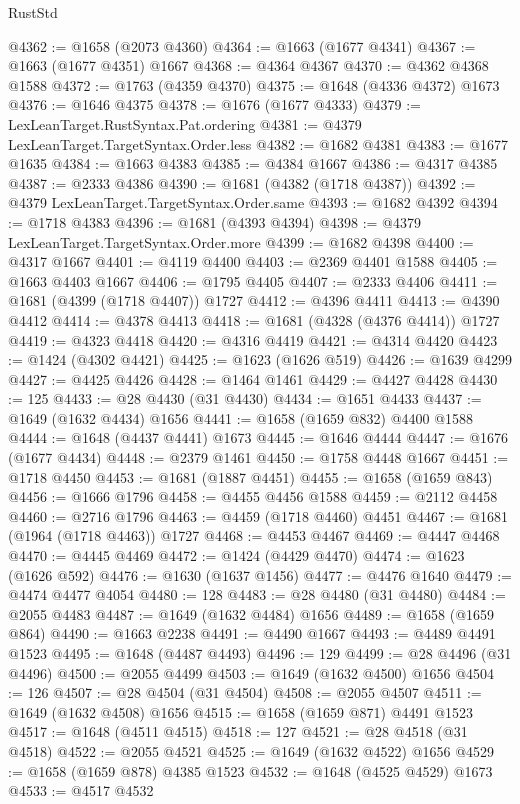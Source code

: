 \begin{lexlean}{RustStd}
\begin{coremodule}
{\begin{coremodule}
{{{{{{{{{{{{{{{{{{{{{{{{{{{{{{{{{{{{{{{{{{{{@4362 := @1658 (@2073 @4360)
@4364 := @1663 (@1677 @4341)
@4367 := @1663 (@1677 @4351) @1667
@4368 := @4364 @4367
@4370 := @4362 @4368 @1588
@4372 := @1763 (@4359 @4370)
@4375 := @1648 (@4336 @4372) @1673
@4376 := @1646 @4375
@4378 := @1676 (@1677 @4333)
@4379 := LexLeanTarget.RustSyntax.Pat.ordering
@4381 := @4379 LexLeanTarget.TargetSyntax.Order.less
@4382 := @1682 @4381
@4383 := @1677 @1635
@4384 := @1663 @4383
@4385 := @4384 @1667
@4386 := @4317 @4385
@4387 := @2333 @4386
@4390 := @1681 (@4382 (@1718 @4387))
@4392 := @4379 LexLeanTarget.TargetSyntax.Order.same
@4393 := @1682 @4392
@4394 := @1718 @4383
@4396 := @1681 (@4393 @4394)
@4398 := @4379 LexLeanTarget.TargetSyntax.Order.more
@4399 := @1682 @4398
@4400 := @4317 @1667
@4401 := @4119 @4400
@4403 := @2369 @4401 @1588
@4405 := @1663 @4403 @1667
@4406 := @1795 @4405
@4407 := @2333 @4406
@4411 := @1681 (@4399 (@1718 @4407)) @1727
@4412 := @4396 @4411
@4413 := @4390 @4412
@4414 := @4378 @4413
@4418 := @1681 (@4328 (@4376 @4414)) @1727
@4419 := @4323 @4418
@4420 := @4316 @4419
@4421 := @4314 @4420
@4423 := @1424 (@4302 @4421)
@4425 := @1623 (@1626 @519)
@4426 := @1639 @4299
@4427 := @4425 @4426
@4428 := @1464 @1461
@4429 := @4427 @4428
@4430 := 125
@4433 := @28 @4430 (@31 @4430)
@4434 := @1651 @4433
@4437 := @1649 (@1632 @4434) @1656
@4441 := @1658 (@1659 @832) @4400 @1588
@4444 := @1648 (@4437 @4441) @1673
@4445 := @1646 @4444
@4447 := @1676 (@1677 @4434)
@4448 := @2379 @1461
@4450 := @1758 @4448 @1667
@4451 := @1718 @4450
@4453 := @1681 (@1887 @4451)
@4455 := @1658 (@1659 @843)
@4456 := @1666 @1796
@4458 := @4455 @4456 @1588
@4459 := @2112 @4458
@4460 := @2716 @1796
@4463 := @4459 (@1718 @4460) @4451
@4467 := @1681 (@1964 (@1718 @4463)) @1727
@4468 := @4453 @4467
@4469 := @4447 @4468
@4470 := @4445 @4469
@4472 := @1424 (@4429 @4470)
@4474 := @1623 (@1626 @592)
@4476 := @1630 (@1637 @1456)
@4477 := @4476 @1640
@4479 := @4474 @4477 @4054
@4480 := 128
@4483 := @28 @4480 (@31 @4480)
@4484 := @2055 @4483
@4487 := @1649 (@1632 @4484) @1656
@4489 := @1658 (@1659 @864)
@4490 := @1663 @2238
@4491 := @4490 @1667
@4493 := @4489 @4491 @1523
@4495 := @1648 (@4487 @4493)
@4496 := 129
@4499 := @28 @4496 (@31 @4496)
@4500 := @2055 @4499
@4503 := @1649 (@1632 @4500) @1656
@4504 := 126
@4507 := @28 @4504 (@31 @4504)
@4508 := @2055 @4507
@4511 := @1649 (@1632 @4508) @1656
@4515 := @1658 (@1659 @871) @4491 @1523
@4517 := @1648 (@4511 @4515)
@4518 := 127
@4521 := @28 @4518 (@31 @4518)
@4522 := @2055 @4521
@4525 := @1649 (@1632 @4522) @1656
@4529 := @1658 (@1659 @878) @4385 @1523
@4532 := @1648 (@4525 @4529) @1673
@4533 := @4517 @4532
}}}}}}}}}}}}}}}}}}}}}}}}}}}}}}}}}}}}}}}}}}}}
\end{coremodule}}
\end{coremodule}
\end{lexlean}
